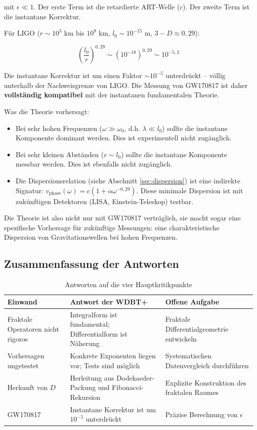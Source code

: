 \documentclass[12pt,a4paper]{article}
\begin{document}
mit $\epsilon \ll 1$. Der erste Term ist die retardierte ART-Welle ($c$). Der zweite Term ist die instantane Korrektur.

Für LIGO ($r \sim 10^3$ km bis $10^9$ km, $l_0 \sim 10^{-15}$ m, $3-D \approx 0,29$):

\begin{equation}
\left(\frac{l_0}{r}\right)^{0,29} \sim \left(10^{-18}\right)^{0,29} \sim 10^{-5,2}
\end{equation}

Die instantane Korrektur ist um einen Faktor $\sim 10^{-5}$ unterdrückt -- völlig unterhalb der Nachweisgrenze von LIGO. Die Messung von GW170817 ist daher \textbf{vollständig kompatibel} mit der instantanen fundamentalen Theorie.

Was die Theorie vorhersagt:
\begin{itemize}
\item Bei sehr hohen Frequenzen ($\omega \gg \omega_0$, d.h. $\lambda \ll l_0$) sollte die instantane Komponente dominant werden. Dies ist experimentell nicht zugänglich.
\item Bei sehr kleinen Abständen ($r \sim l_0$) sollte die instantane Komponente messbar werden. Dies ist ebenfalls nicht zugänglich.
\item Die Dispersionsrelation (siehe Abschnitt \ref{sec:dispersion}) ist eine indirekte Signatur: $v_{\text{phase}}(\omega) = c(1 + \alpha \omega^{-0,29})$. Diese minimale Dispersion ist mit zukünftigen Detektoren (LISA, Einstein-Teleskop) testbar.
\end{itemize}

Die Theorie ist also nicht nur mit GW170817 verträglich, sie macht sogar eine spezifische Vorhersage für zukünftige Messungen: eine charakteristische Dispersion von
Gravitationswellen bei hohen Frequenzen.

\subsection{Zusammenfassung der Antworten}

\begin{table}[ht]
\centering
\caption{Antworten auf die vier Hauptkritikpunkte}
\begin{tabular}{p{5cm}p{5cm}p{4cm}}
\toprule
Einwand & Antwort der WDBT+ & Offene Aufgabe \\
\midrule
Fraktale Operatoren nicht rigoros & Integralform ist fundamental; Differentialform ist Näherung & Fraktale Differentialgeometrie entwickeln \\
Vorhersagen ungetestet & Konkrete Exponenten liegen vor; Tests sind möglich & Systematischen Datenvergleich durchführen \\
Herkunft von $D$ & Herleitung aus Dodekaeder-Packung und Fibonacci-Rekursion & Explizite Konstruktion des fraktalen Raumes \\
GW170817 & Instantane Korrektur ist um $10^{-5}$ unterdrückt & Präzise Berechnung von $\epsilon$ \\
\bottomrule
\end{tabular}
\end{table}
\end{document}
